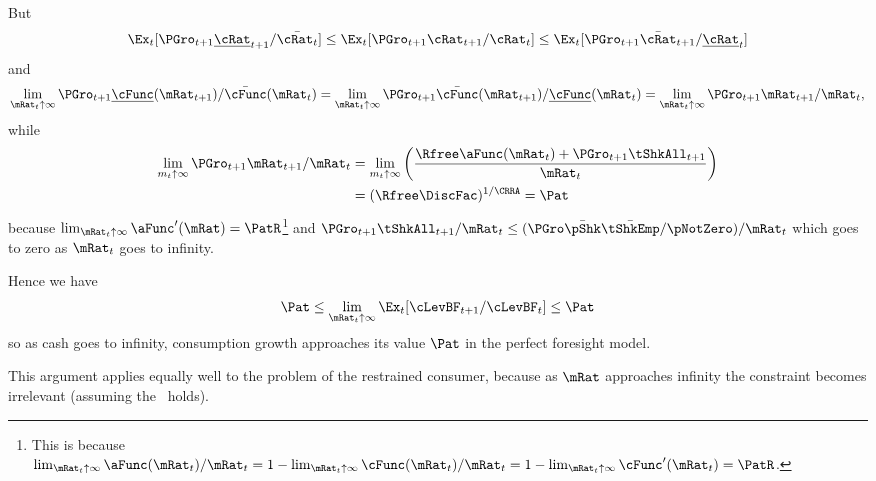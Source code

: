 \documentclass[BufferStockTheory]{subfiles}
\begin{document}
But
\begin{align*}
  \Ex_{t}[{\PGro}_{t+1} {\ushort{\cRat}}_{t+1}/\bar{\cRat_{t}}] \leq \Ex_{t}[{\PGro}_{t+1} {\cRat}_{t+1}/\cRat_{t}] \leq \Ex_{t}[{\PGro}_{t+1} {\bar{\cRat}}_{t+1}/\ushort{\cRat}_{t}]
\end{align*}
and
\begin{equation}  \label{eq:xttoinfty}
  \lim_{\mRat_t \uparrow \infty} \PGro_{t+1}\ushort{\cFunc}(\mRat_{t+1})/\bar{\cFunc}(\mRat_t) =
  \lim_{\mRat_{t} \uparrow \infty} \PGro_{t+1}\bar{\cFunc}(\mRat_{t+1})/\ushort{\cFunc}(\mRat_t) =
  \lim_{\mRat_{t} \uparrow \infty}\PGro_{t+1} \mRat_{t+1}/\mRat_t,  \notag
\end{equation}
while \hypertarget{xtp1toinfty}{}
\begin{align}  \label{eq:xtp1toinfty}
  \lim_{m_{t} \uparrow \infty} \PGro_{t+1} \mRat_{t+1}/\mRat_t  & = \lim_{m_{t} \uparrow \infty}
                                                                  \left(\frac{\Rfree \aFunc(\mRat_t)+{\PGro}_{t+1}\tShkAll_{t+1}}{\mRat_t}\right)
  \\  & = (\Rfree \DiscFac)^{1/\CRRA} = \Pat
\end{align}
because $\lim_{\mRat_{t}\uparrow \infty} \aFunc^{\prime}(\mRat)=\PatR$\footnote{This is because $\lim_{\mRat_{t}\uparrow \infty} \aFunc(\mRat_{t})/\mRat_{t}=1-\lim_{\mRat_{t}\uparrow \infty} \cFunc(\mRat_{t})/\mRat_{t}=1-\lim_{\mRat_{t}\uparrow \infty}\cFunc^{\prime}(\mRat_{t})=\PatR$.} and
$\PGro_{t+1}\tShkAll_{t+1}/\mRat_{t} \leq (\PGro \bar{\pShk} \bar{\tShkEmp}/\pNotZero )/\mRat_{t}$ which
goes to zero as $\mRat_{t}$ goes to infinity.

Hence we have
\begin{equation}
  {\Pat}  \leq \lim_{\mRat_{t} \uparrow \infty} \Ex_{t}[\cLevBF_{t+1}/\cLevBF_{t}] \leq {\Pat} \nonumber
\end{equation}
so as cash goes to infinity, consumption growth approaches its
value $\Pat$ in the perfect foresight model.

This argument applies equally well to the problem of the restrained
consumer, because as $\mRat$ approaches infinity the constraint becomes
irrelevant (assuming the \FHWC~holds).

\end{document}
